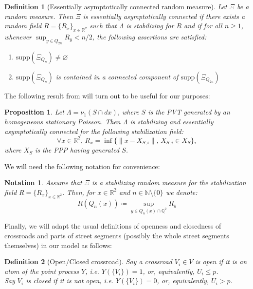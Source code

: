 \documentclass[11pt,a4paper]{amsart}
\theoremstyle{exampstyle}
\newtheorem{Definition}{Definition}
\newtheorem{Proposition}{Proposition}
\theoremstyle{exampnotations}
\newtheorem{Notation}{Notation}
\begin{document}
\begin{Definition}[Essentially asymptotically connected random measure]
Let $\Xi$ be a random measure. Then $\Xi$ is \emph{essentially asymptotically connected} if there exists a random field $R = \lbrace R_{x} \rbrace_{x \in \mathbb{R}^{d}}$ such that $\Lambda$ is stabilizing for $R$ and if for all $n \geq 1$, whenever $\displaystyle \sup_{y \in Q_{2n}} R_{y} < n/2$, the following assertions are satisfied:
\begin{enumerate}[label = (\arabic*)]
\item $\text{supp}(\Xi_{Q_{n}}) \neq \varnothing$
\item $\text{supp}(\Xi_{Q_{n}})$ is contained in a connected component of $\text{supp}(\Xi_{Q_{2n}})$
\end{enumerate}
\end{Definition}

The following result from \cite{hirsch_continuum_2017} will turn out to be useful for our purposes:

\begin{Proposition}
Let $\Lambda = \nu_{1}(S \cap dx)$, where $S$ is the PVT generated by an homogeneous stationary Poisson. Then $\Lambda$ is stabilizing and essentially asymptotically connected for the following stabilization field:
$$\forall x \in \mathbb{R}^{2}, \, R_x = \inf \lbrace \lVert x - X_{S,i} \rVert , \, X_{S,i} \in X_{S} \rbrace,$$
where $X_S$ is the PPP having generated $S$.
\end{Proposition}

We will need the following notation for convenience:

\begin{Notation}
Assume that $\Xi$ is a stabilizing random measure for the stabilization field $R = \lbrace R_x \rbrace _{x \in \mathbb{R}^{2}}.$ Then, for $x \in \mathbb{R}^{2}$ and $n \in \mathbb{N}\setminus \lbrace 0 \rbrace$ we denote:
$$R(Q_n(x)) \coloneqq \sup_{y \in Q_n(x) \cap \mathbb{Q}^{2}} R_y$$
\end{Notation}

Finally, we will adapt the usual definitions of openness and closedness of crossroads and parts of street segments (possibly the whole street segments themselves) in our model as follows:

\begin{Definition}[Open/Closed crossroad]
Say a crossroad $V_{i} \in V$ is \emph{open} if it is an atom of the point process $Y$, i.e. $Y(\lbrace V_i \rbrace) = 1$, or, equivalently, $U_i \leq p$. \\ Say $V_{i}$ is \emph{closed} if it is not open, i.e. $Y(\lbrace V_i \rbrace) = 0$, or, equivalently, $U_i > p$.
\end{Definition}
\end{document}
